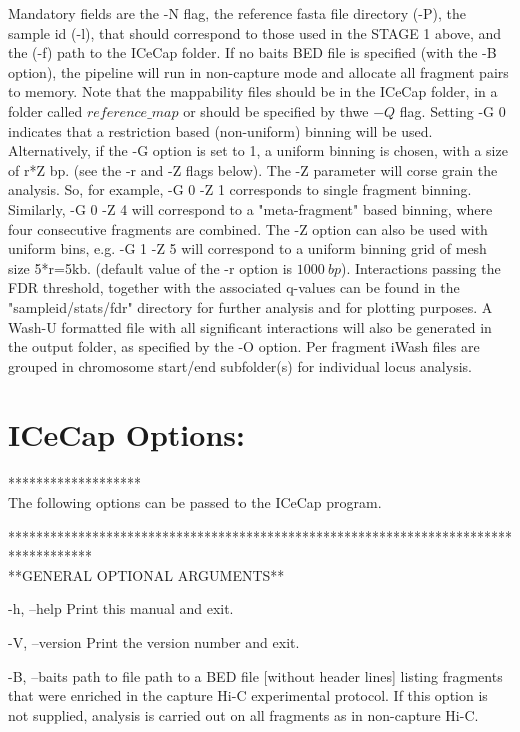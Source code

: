 \documentclass[10pt,a4paper]{article}
\begin{document}
Mandatory fields are the -N flag, the reference fasta file directory (-P), the sample id (-l), that should correspond to those used in the STAGE 1 above, and the (-f) path to the ICeCap folder.
If no baits BED file is specified (with the -B option), the pipeline will run in non-capture mode and allocate all fragment pairs to memory.
Note that the mappability files should be in the ICeCap folder, in a folder called $reference\_map$ or should be specified by thwe $-Q$ flag.
Setting -G 0 indicates that a restriction based (non-uniform) binning will be used.
Alternatively, if the -G option is set to 1, a uniform binning is chosen, with a size of r*Z bp. (see the -r and -Z flags below).
The -Z parameter will corse grain the analysis. So, for example, -G 0 -Z 1 corresponds to single fragment binning.
Similarly, -G 0 -Z 4 will correspond to a "meta-fragment" based binning, where four consecutive fragments are combined.
The -Z option can also be used with uniform bins, e.g. -G 1 -Z 5 will correspond to a uniform binning grid of mesh size 5*r=5kb. (default value 
of the -r option is $1000~bp$).
Interactions passing the FDR threshold, together with the associated q-values can be found in the "sampleid/stats/fdr" directory for further analysis and for plotting purposes. A Wash-U formatted file with all significant interactions will also be generated in the output folder, as specified by the -O option. Per fragment iWash files are grouped in chromosome start/end subfolder(s) for individual locus analysis.


\section{ICeCap Options:}
*******************\\
The following options can be passed to the ICeCap program.

************************************************************************************\\
**GENERAL OPTIONAL ARGUMENTS**

        -h, --help    Print this manual and exit.

        -V, --version   Print the version number and exit.

        -B, --baits path to file path to a BED file [without header lines] listing fragments that were enriched in the capture Hi-C experimental protocol.  If this option is not supplied, analysis is carried out on all fragments as in non-capture Hi-C. \\
\end{document}
